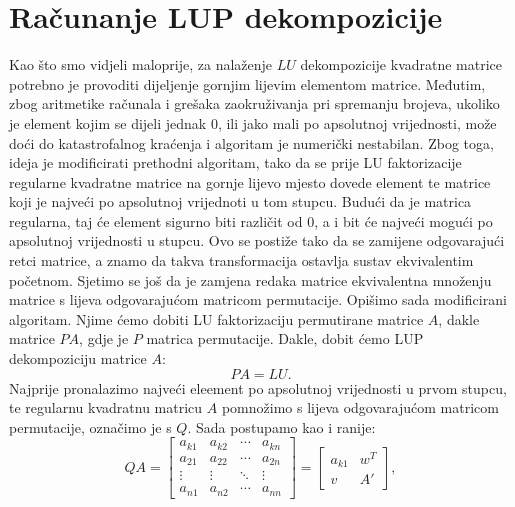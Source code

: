 \documentclass[a4paper,12pt,oneside]{article}
\begin{document}
\section*{Računanje LUP dekompozicije}
Kao što smo vidjeli maloprije, za nalaženje $LU$ dekompozicije kvadratne matrice potrebno je provoditi dijeljenje gornjim lijevim elementom matrice. Međutim, zbog aritmetike računala i grešaka zaokruživanja pri spremanju brojeva, ukoliko je element kojim se dijeli jednak $0$, ili jako mali po apsolutnoj vrijednosti, može doći do katastrofalnog kraćenja i algoritam je numerički nestabilan. \newline \newline
\noindent Zbog toga, ideja je modificirati prethodni algoritam, tako da se prije LU faktorizacije regularne kvadratne matrice na gornje lijevo mjesto dovede element te matrice koji je najveći po apsolutnoj vrijednoti u tom stupcu. Budući da je matrica regularna, taj će element sigurno biti različit od $0$, a i bit će najveći mogući po apsolutnoj vrijednosti u stupcu. \newline\newline 
\noindent Ovo se postiže tako da se zamijene odgovarajući retci matrice, a znamo da takva transformacija ostavlja sustav ekvivalentim početnom.  \newline \newline
\noindent Sjetimo se još da je zamjena redaka matrice ekvivalentna množenju matrice s lijeva odgovarajućom matricom permutacije.\newline\newline
\noindent Opišimo sada modificirani algoritam. Njime ćemo dobiti LU faktorizaciju permutirane matrice $A$, dakle matrice $PA$, gdje je $P$ matrica permutacije. Dakle, dobit ćemo LUP dekompoziciju matrice $A$:
$$PA = LU.$$
\noindent Najprije pronalazimo najveći eleement po apsolutnoj vrijednosti u prvom stupcu, te regularnu kvadratnu matricu $A$ pomnožimo s lijeva odgovarajućom matricom permutacije, označimo je s $Q$.
Sada postupamo kao i ranije:
$$
QA =  \left[\begin{array}{c|ccc}a_{k1} & a_{k2} & \cdots & a_{kn}\\
	\hline
	a_{21} & a_{22} & \cdots & a_{2n}\\
	\vdots & \vdots & \ddots & \vdots\\
	a_{n1} & a_{n2} & \cdots &a_{nn}\end{array}\right] = \left[\begin{array}{cc}a_{k1} & w^{T} \\
	v & A' \end{array}\right] ,
$$
\end{document}
